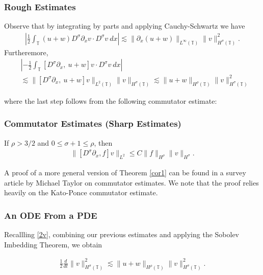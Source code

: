 \documentclass{beamer}
\newcommand{\p}{\partial}
\newcommand{\ci}{\mathbb{T}}
\begin{document}
%
%
\begin{frame}
	\frametitle{Rough Estimates}
Observe that by integrating by parts
and applying Cauchy-Schwartz we have
%
%
\begin{equation}
\begin{split}
\left | \frac{1}{2}\int_{\ci} (u+w) D^\sigma \p_x v \cdot
D^\sigma v \ dx \right |
\lesssim \|\p_x (u+w)\|_{L^\infty(\ci)}
\|v\|_{H^\sigma(\ci)}^2.
\label{4'v}
\end{split}
\end{equation}
%
%
Furtheremore, 
\begin{equation}
\begin{split}
& \left | -\frac{1}{2} \int_{\ci} [D^\sigma \p_x, \ u+w] v
\cdot D^\sigma v \ dx \right |
\\
& \lesssim \|[D^\sigma \p_x, \ u+w]v\|_{L^2(\ci)}
\|v\|_{H^\sigma(\ci)} \lesssim \|u+w\|_{H^\rho(\ci)} 
\|v\|_{H^\sigma(\ci)}^2
\label{7v}
\end{split}
\end{equation}

where the last step follows from the following commutator
estimate:
%
\end{frame}
%
%
\begin{frame}
	\frametitle{Commutator Estimates (Sharp Estimates)}
%
\begin{theorem}
\label{cor1}
If $\rho > 3/2$ and $0 \le \sigma + 1 \le \rho$, then
%
%
\begin{equation}
\begin{split}
\|[D^\sigma \p_x ,f]v\|_{L^2} \le C \|f\|_{H^\rho} \|v\|_{H^\sigma}.
\label{15}
\end{split}
\end{equation}
%
%
\end{theorem}
A proof of a more general version of Theorem \ref{cor1} can be found in a survey article by Michael Taylor on 
commutator estimates. We note that the proof relies heavily on the  
Kato-Ponce commutator estimate. %
\end{frame}
%
%
\begin{frame}
	\frametitle{An ODE From a PDE}
Recallling \eqref{2v}, combining our previous estimates and applying the Sobolev Imbedding 
Theorem, we obtain 
%
%

%
%
%
\begin{equation}
\begin{split}
\frac{1}{2} \frac{d}{dt}
\|v\|_{H^\sigma(\ci)}^2 \lesssim \|u+w\|_{H^\rho(\ci)}
\|v\|_{H^\sigma(\ci)}^2.
\label{9v}
\end{split}
\end{equation}
%
%
\end{frame}
\end{document}
